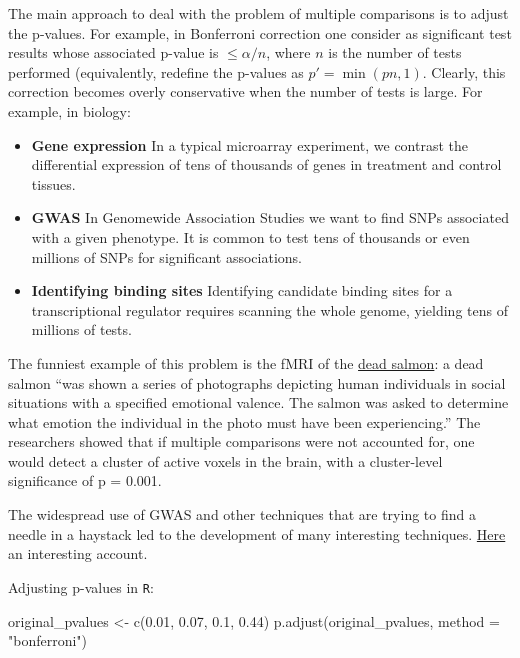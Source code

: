 \documentclass[
  letterpaper,
  DIV=11,
  numbers=noendperiod]{scrreprt}
\newenvironment{Shaded}{\begin{snugshade}}{\end{snugshade}}
\newcommand{\NormalTok}[1]{\textcolor[rgb]{0.00,0.23,0.31}{#1}}
\begin{document}
The main approach to deal with the problem of multiple comparisons is to
adjust the p-values. For example, in Bonferroni correction one consider
as significant test results whose associated p-value is
\(\leq \alpha / n\), where \(n\) is the number of tests performed
(equivalently, redefine the p-values as \(p' = \min(p n, 1)\). Clearly,
this correction becomes overly conservative when the number of tests is
large. For example, in biology:

\begin{itemize}
\item
  \textbf{Gene expression} In a typical microarray experiment, we
  contrast the differential expression of tens of thousands of genes in
  treatment and control tissues.
\item
  \textbf{GWAS} In Genomewide Association Studies we want to find SNPs
  associated with a given phenotype. It is common to test tens of
  thousands or even millions of SNPs for significant associations.
\item
  \textbf{Identifying binding sites} Identifying candidate binding sites
  for a transcriptional regulator requires scanning the whole genome,
  yielding tens of millions of tests.
\end{itemize}

The funniest example of this problem is the fMRI of the
\href{http://prefrontal.org/files/posters/Bennett-Salmon-2009.pdf}{dead
salmon}: a dead salmon ``was shown a series of photographs depicting
human individuals in social situations with a specified emotional
valence. The salmon was asked to determine what emotion the individual
in the photo must have been experiencing.'' The researchers showed that
if multiple comparisons were not accounted for, one would detect a
cluster of active voxels in the brain, with a cluster-level significance
of p = 0.001.

The widespread use of GWAS and other techniques that are trying to find
a needle in a haystack led to the development of many interesting
techniques.
\href{http://lybird300.github.io/2015/10/19/multiple-test-correction.html}{Here}
an interesting account.

Adjusting p-values in \texttt{R}:

\begin{Shaded}
\begin{Highlighting}[]
\NormalTok{original\_pvalues \textless{}{-} c(0.01, 0.07, 0.1, 0.44)}
\NormalTok{p.adjust(original\_pvalues, method = "bonferroni")}
\end{Highlighting}
\end{Shaded}
\end{document}
